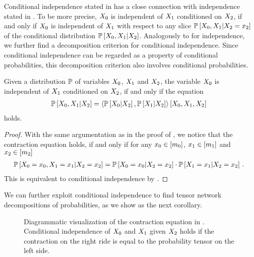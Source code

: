 Conditional independence stated in  has a close connection with independence stated in .
To be more precise, $X_{0}$ is independent of $X_{1}$ conditioned on $X_{2}$, if and only if $X_{0}$ is independent of $X_{1}$ with respect to any slice $\mathbb{P}\left[X_{0},X_{1}|X_{2}=x_{2}\right]$ of the conditional distribution $\mathbb{P}\left[X_{0},X_{1}|X_{2}\right]$.
Analogously to  for independence, we further find a decomposition criterion for conditional independence.
Since conditional independence can be regarded as a property of conditional probabilities, this decomposition criterion also involves conditional probabilities.

\begin{theorem}
    \label{the:condIndependenceProductCriterion}
    Given a distribution $\mathbb{P}$ of variables $X_{0}$, $X_{1}$ and $X_{2}$, the variable $X_{0}$ is independent of $X_{1}$ conditioned on $X_{2}$, if and only if the equation
    \begin{align*}
        \mathbb{P}\left[X_{0},X_{1}|X_{2}\right]
        = \left\langle 
            \mathbb{P}\left[X_{0}|X_{2}\right],\mathbb{P}\left[X_{1}|X_{2}\right]
        \right\rangle \left[ X_{0},X_{1},X_{2} \right]
    \end{align*}
    holds.
\end{theorem}
\begin{proof}
    With the same argumentation as in the proof of , we notice that the contraction equation holds, if and only if for any $x_{0}\in[m_{0}]$, $x_{1}\in[m_{1}]$ and $x_{2}\in[m_{2}]$
    \begin{align*}
        \mathbb{P}\left[X_{0}=x_{0},X_{1}=x_{1}|X_{2}=x_{2}\right]
        = \mathbb{P}\left[X_{0}=x_{0}|X_{2}=x_{2}\right] \cdot \mathbb{P}\left[X_{1}=x_{1}|X_{2}=x_{2}\right] \, .
    \end{align*}
    This is equivalent to conditional independence by .
\end{proof}

We can further exploit conditional independence to find tensor network decompositions of probabilities, as we show as the next corollary.
\begin{figure}[hbt!]
    \begin{center}
        
    \end{center}
    \caption{Diagrammatic visualization of the contraction equation in .
    Conditional independence of $X_{0}$ and $X_{1}$ given $X_{2}$ holds if the contraction on the right ride is equal to the probability tensor on the left side.}
    \label{fig:condIndependenceDecomposition}
\end{figure}


